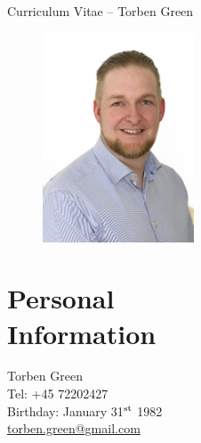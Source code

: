 \documentclass[margin,line,a4paper]{resume}
\begin{document}
{\sc \Large Curriculum Vitae -- Torben Green}
\begin{resume}
    \vspace{0.5cm}
    \begin{figure}
      \vspace{-1cm}
      \begin{center}
        \includegraphics[width=0.4\textwidth]{TOG_visitkort}
      \end{center}
      \vspace{-1cm}
    \end{figure}

    \section{\mysidestyle Personal\\Information}%
    Torben Green \\
    Tel: +45 72202427 \\
    Birthday: January 31$^{\rm st}$ 1982\\
    \href{mailto:torben.green@gmail.com}{torben.green@gmail.com} 


\end{resume}
\end{document}
